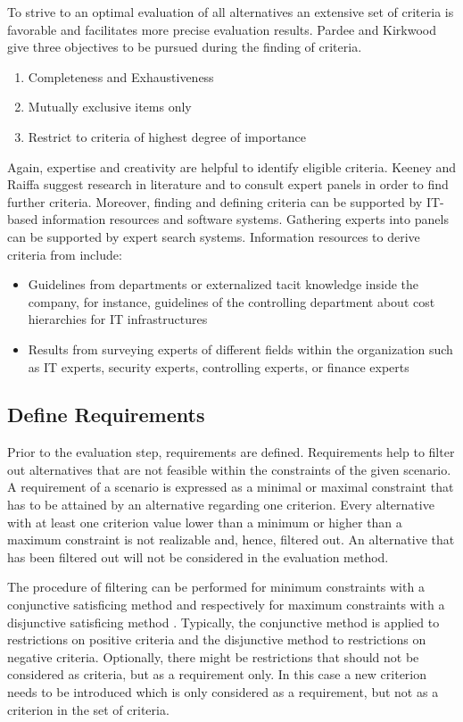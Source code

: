 \documentclass[journal,final,a4paper,twoside]{IEEEtran}
\begin{document}
To strive to an optimal evaluation of all alternatives an extensive set of criteria is favorable and facilitates more precise evaluation results. Pardee and Kirkwood \cite{pardee1969measurement} give three objectives to be pursued during the finding of criteria.
\begin{enumerate}
\item Completeness and Exhaustiveness
\item Mutually exclusive items only
\item Restrict to criteria of highest degree of importance
\end{enumerate}

Again, expertise and creativity are helpful to identify eligible criteria. Keeney and Raiffa \cite{keeney1993decisions} suggest research in literature and to consult expert panels in order to find further criteria. Moreover, finding and defining criteria can be supported by IT-based information resources and software systems. Gathering experts into panels can be supported by expert search systems. Information resources to derive criteria from include:
\begin{itemize}
\item Guidelines from departments or externalized tacit knowledge inside the company, for instance, guidelines of the controlling department about cost hierarchies for IT infrastructures
\item Results from surveying experts of different fields within the organization such as IT experts, security experts, controlling experts, or finance experts
\end{itemize}


\subsection{Define Requirements}
Prior to the evaluation step, requirements are defined. Requirements help to filter out alternatives that are not feasible within the constraints of the given scenario. A requirement of a scenario is expressed as a minimal or maximal constraint that has to be attained by an alternative regarding one criterion. Every alternative with at least one criterion value lower than a minimum or higher than a maximum constraint is not realizable and, hence, filtered out. An alternative that has been filtered out will not be considered in the evaluation method.

The procedure of filtering can be performed for minimum constraints with a conjunctive satisficing method and respectively for maximum constraints with a disjunctive satisficing method \cite{yoon1995multiple}. Typically, the conjunctive method is applied to restrictions on positive criteria and the disjunctive method to restrictions on negative criteria.
Optionally, there might be restrictions that should not be considered as criteria, but as a requirement only. In this case a new criterion needs to be introduced which is only considered as a requirement, but not as a criterion in the set of criteria.
\end{document}
